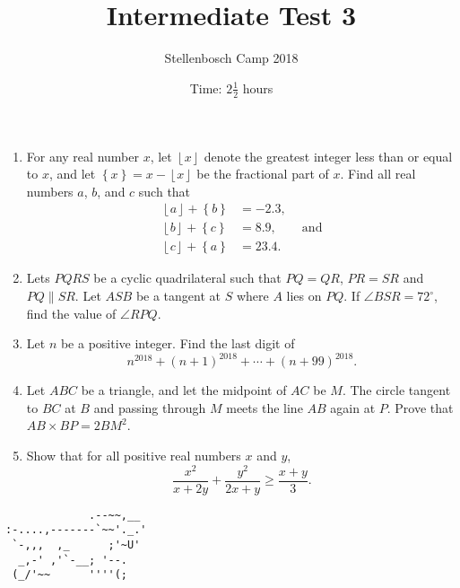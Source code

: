 \documentclass{article}
\title{Intermediate Test 3}
\author{Stellenbosch Camp 2018}
\date{Time: $2\frac{1}{2}$ hours}
\newcommand{\floor}[1]{\ensuremath{\left\lfloor#1\right\rfloor}}
\newcommand{\fracpart}[1]{\ensuremath{\left\{#1\right\}}}
\begin{document}
\maketitle

\begin{enumerate}[1.]

\item %
For any real number $x$, let $\floor{x}$ denote the greatest integer less than or equal to $x$, and let $\fracpart{x} = x -\floor{x}$ be the fractional part of $x$. Find all real numbers $a$, $b$, and $c$ such that
\begin{align*}
  \floor{a} +\fracpart{b} &= -2.3, \\
  \floor{b} +\fracpart{c} &= 8.9, \qquad \mathrm{and}\\
  \floor{c} +\fracpart{a} &= 23.4.
\end{align*}


\vspace{12pt}
\item %
Lets $PQRS$ be a cyclic quadrilateral such that $PQ = QR$, $PR = SR$ and $PQ \parallel SR$. Let $ASB$ be a tangent at $S$ where $A$ lies on $PQ$. If $\angle BSR = 72^{\circ}$, find the value of $\angle RPQ$.


\vspace{12pt}
\item %
Let $n$ be a positive integer. Find the last digit of \[ n^{2018} +(n+1)^{2018} +\dotsb +(n+99)^{2018}. \]


\vspace{12pt}
\item %
Let $ABC$ be a triangle, and let the midpoint of $AC$ be $M$. The circle tangent to $BC$ at $B$ and passing through $M$ meets the line $AB$ again at $P$. Prove that $AB \times BP = 2 BM^2$.


\vspace{12pt}
\item %
Show that for all positive real numbers $x$ and $y$, \[ \frac{x^2}{x+2y} +\frac{y^2}{2x+y} \geq \frac{x+y}{3}. \] 


\end{enumerate}


\vfill
\centering
\begin{BVerbatim}
             .--~~,__
:-....,-------`~~'._.'
 `-,,,  ,_      ;'~U'
  _,-' ,'`-__; '--.
 (_/'~~      ''''(;
\end{BVerbatim}
\end{document}
